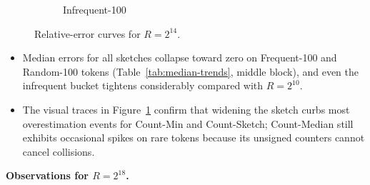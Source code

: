 \documentclass[11pt]{article}
\begin{document}
\begin{figure}[H]
\begin{subfigure}[t]{0.32\linewidth}
    \caption{Infrequent-100}
  \end{subfigure}
  \caption{Relative-error curves for $R=2^{14}$.}
  \label{fig:error-r16384}
\end{figure}



\begin{itemize}
  \item Median errors for all sketches collapse toward zero on Frequent-100 and Random-100 tokens (Table~\ref{tab:median-trends}, middle block), and even the infrequent bucket tightens considerably compared with $R=2^{10}$.
  \item The visual traces in Figure~\ref{fig:error-r16384} confirm that widening the sketch curbs most overestimation events for Count-Min and Count-Sketch; Count-Median still exhibits occasional spikes on rare tokens because its unsigned counters cannot cancel collisions.
\end{itemize}

\newpage

\noindent\textbf{Observations for $R=2^{18}$.}
\end{document}
